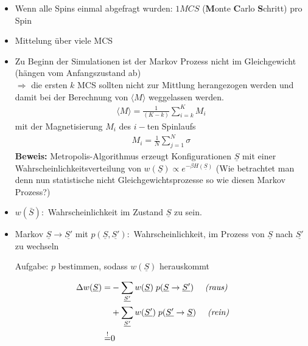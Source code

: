 \documentclass[12pt]{article}
\begin{document}
\begin{itemize}
\item Wenn alle Spins einmal abgefragt wurden: $1MCS$ (\textbf{M}onte \textbf{C}arlo \textbf{S}chritt) pro Spin
\item Mittelung über viele MCS

\item Zu Beginn der Simulationen ist der Markov Prozess nicht im Gleichgewicht (hängen vom Anfangszustand ab) \\
$\Rightarrow$  die ersten $k$ MCS sollten nicht zur Mittlung herangezogen werden und damit bei der Berechnung von $\langle M \rangle$ weggelassen werden.
 \begin{align}
\langle M \rangle = \frac{1}{(K-k)} \sum_{i=k}^K M_i 
\end{align}
mit der Magnetisierung $M_i$ des $i-$ten Spinlaufs
\begin{align*}
M_i = \frac{1}{N} \sum_{j=1}^N \sigma
\end{align*}
\textbf{Beweis:} Metropolis-Algorithmus erzeugt Konfigurationen $\underline{S}$ mit einer Wahrscheinlichkeitsverteilung von $w(\underline{S}) \propto e^{-\beta H(\underline{S})}$ (Wie betrachtet man denn nun statistische nicht Gleichgewichtsprozesse so wie diesen Markov Prozess?)
\item $w(\bar{S}):$ Wahrscheinlichkeit im Zustand $\underline{S}$ zu sein.
\item Markov $\underline{S} \rightarrow \underline{S'}$ mit $p(\underline{S}, \underline{S'}): $ Wahrscheinlichkeit, im Prozess von $\underline{S}$ nach $\underline{S'}$ zu wechseln

Aufgabe: $p$ bestimmen, sodass $w(\underline{S})$ herauskommt
\end{itemize} %
\begin{align*}
\Delta w(\underline{S}) =& 
- \sum_{\underline{S'}} w(\underline{S}) \; p(\underline{S} \rightarrow \underline{S'})\quad  \mbox{ \textit{(raus)} } \\
 &+  \sum_{\underline{S'}} w(\underline{S'}) \; p(\underline{S'} \rightarrow \underline{S}) \quad \mbox{\textit{ (rein)} } \\ 
 \overset{!}{=}& 0
\end{align*}

\end{document}
